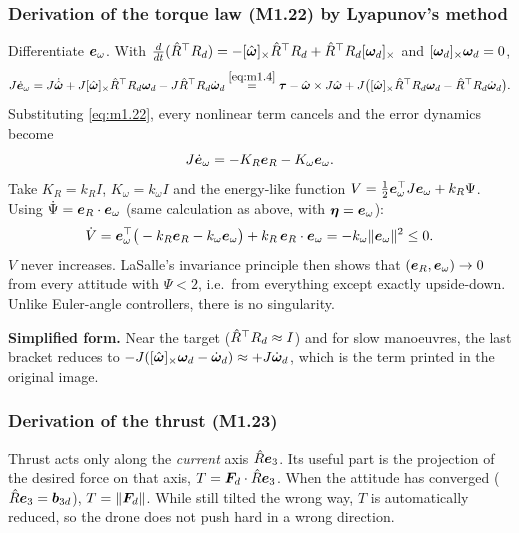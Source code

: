 \subsubsection*{Derivation of the torque law (M1.22) by Lyapunov's method}

Differentiate $\bm{e}_\omega$. With $\frac{d}{dt}(\hat{R}^\top R_d)=-[\hat{\bm\omega}]_{\times}\hat{R}^\top R_d+\hat{R}^\top R_d[\bm{\omega}_d]_{\times}$ and
$[\bm{\omega}_d]_{\times}\bm{\omega}_d=0$,
\[
  J\dot{\bm{e}}_\omega=J\dot{\hat{\bm\omega}}+J[\hat{\bm\omega}]_{\times}\hat{R}^\top R_d\bm{\omega}_d-J\hat{R}^\top R_d\dot{\bm{\omega}}_d
  \overset{\eqref{eq:m1.4}}{=}\bm{\tau}-\hat{\bm\omega}\times J\hat{\bm\omega}+J\big([\hat{\bm\omega}]_{\times}\hat{R}^\top R_d\bm{\omega}_d-\hat{R}^\top R_d\dot{\bm{\omega}}_d\big).
\]
Substituting \eqref{eq:m1.22}, every nonlinear term cancels and the error dynamics become
\[
  J\dot{\bm{e}}_\omega=-K_R\bm{e}_R-K_\omega\bm{e}_\omega .
\]
Take $K_R=k_RI$, $K_\omega=k_\omega I$ and the energy-like function
$V=\tfrac12\bm{e}_\omega^\top J\bm{e}_\omega+k_R\Psi$. Using $\dot\Psi=\bm{e}_R\cdot\bm{e}_\omega$ (same calculation as above,
with $\bm\eta=\bm{e}_\omega$):
\[
  \dot V=\bm{e}_\omega^\top\big(-k_R\bm{e}_R-k_\omega\bm{e}_\omega\big)+k_R\,\bm{e}_R\cdot\bm{e}_\omega=-k_\omega\|\bm{e}_\omega\|^2\le0 .
\]
$V$ never increases. LaSalle's invariance principle then shows that $(\bm{e}_R,\bm{e}_\omega)\to0$ from every attitude with
$\Psi<2$, i.e.\ from everything except exactly upside-down. Unlike Euler-angle controllers, there is no singularity.

\textbf{Simplified form.} Near the target ($\hat{R}^\top R_d\approx I$) and for slow manoeuvres, the last bracket reduces to
$-J([\hat{\bm\omega}]_{\times}\bm{\omega}_d-\dot{\bm{\omega}}_d)\approx+J\dot{\bm{\omega}}_d$, which is the term printed in the original image.

\subsubsection*{Derivation of the thrust (M1.23)}

Thrust acts only along the \emph{current} axis $\hat{R}\bm{e}_3$. Its useful part is the projection of the desired force on
that axis, $T=\bm{F}_d\cdot\hat{R}\bm{e}_3$. When the attitude has converged ($\hat{R}\bm{e}_3=\bm{b}_{3d}$), $T=\|\bm{F}_d\|$. While still
tilted the wrong way, $T$ is automatically reduced, so the drone does not push hard in a wrong direction.

